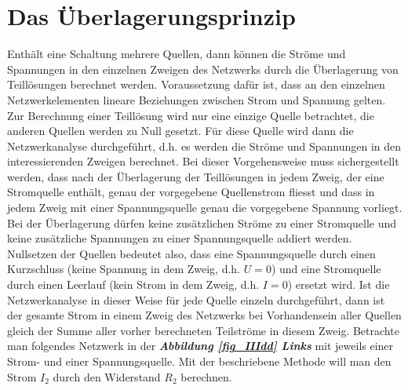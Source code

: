 \section{Das Überlagerungsprinzip}
Enthält eine Schaltung mehrere Quellen, dann können die Ströme und Spannungen in den einzelnen Zweigen des Netzwerks durch die Überlagerung von Teillösungen berechnet werden. Voraussetzung dafür ist, dass an den einzelnen Netzwerkelementen lineare Beziehungen zwischen Strom und Spannung gelten. Zur Berechnung einer Teillösung wird nur eine einzige Quelle betrachtet, die anderen Quellen werden zu Null gesetzt. Für diese Quelle wird dann die Netzwerkanalyse durchgeführt, d.h. es werden die Ströme und Spannungen in den interessierenden Zweigen berechnet. 
\newline\newline
Bei dieser Vorgehensweise muss sichergestellt werden, dass nach der Überlagerung der Teillösungen in jedem Zweig, der eine Stromquelle enthält, genau der vorgegebene Quellenstrom fliesst und dass in jedem Zweig mit einer Spannungsquelle genau die vorgegebene Spannung vorliegt. Bei der Überlagerung dürfen keine zusätzlichen Ströme zu einer Stromquelle und keine zusätzliche Spannungen zu einer Spannungsquelle addiert werden. Nullsetzen der Quellen bedeutet also, dass eine Spannungsquelle durch einen Kurzschluss (keine Spannung in dem Zweig, d.h. $U=0$) und eine Stromquelle durch einen Leerlauf (kein Strom in dem Zweig, d.h. $I=0$) ersetzt wird.
\newline\newline
Ist die Netzwerkanalyse in dieser Weise für jede Quelle einzeln durchgeführt, dann ist der gesamte Strom in einem Zweig des Netzwerks bei Vorhandensein aller Quellen gleich der Summe aller vorher berechneten Teilströme in diesem Zweig.
\newline\newline
Betrachte man folgendes Netzwerk in der \textbf{\textit{Abbildung \ref{fig_IIIdd} Links}} mit jeweils einer Strom- und einer Spannungsquelle. Mit der beschriebene Methode will man den Strom $I_2$ durch den Widerstand $R_2$ berechnen.
